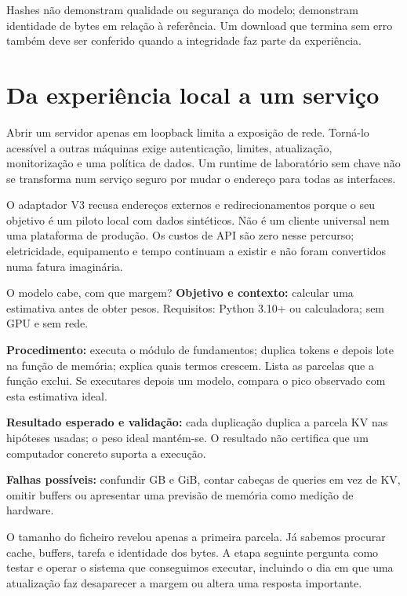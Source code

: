 Hashes não demonstram qualidade ou segurança do modelo; demonstram identidade de bytes em relação à referência. Um download que termina sem erro também deve ser conferido quando a integridade faz parte da experiência.

\section{Da experiência local a um serviço}
Abrir um servidor apenas em loopback limita a exposição de rede. Torná-lo acessível a outras máquinas exige autenticação, limites, atualização, monitorização e uma política de dados. Um runtime de laboratório sem chave não se transforma num serviço seguro por mudar o endereço para todas as interfaces.

O adaptador V3 recusa endereços externos e redirecionamentos porque o seu objetivo é um piloto local com dados sintéticos. Não é um cliente universal nem uma plataforma de produção. Os custos de API são zero nesse percurso; eletricidade, equipamento e tempo continuam a existir e não foram convertidos numa fatura imaginária.

\begin{promptlabbox}{O modelo cabe, com que margem?}
\textbf{Objetivo e contexto:} calcular uma estimativa antes de obter pesos. Requisitos: Python 3.10+ ou calculadora; sem GPU e sem rede.

\textbf{Procedimento:} executa o módulo de fundamentos; duplica tokens e depois lote na função de memória; explica quais termos crescem. Lista as parcelas que a função exclui. Se executares depois um modelo, compara o pico observado com esta estimativa ideal.

\textbf{Resultado esperado e validação:} cada duplicação duplica a parcela KV nas hipóteses usadas; o peso ideal mantém-se. O resultado não certifica que um computador concreto suporta a execução.

\textbf{Falhas possíveis:} confundir GB e GiB, contar cabeças de queries em vez de KV, omitir buffers ou apresentar uma previsão de memória como medição de hardware.
\end{promptlabbox}

O tamanho do ficheiro revelou apenas a primeira parcela. Já sabemos procurar cache, buffers, tarefa e identidade dos bytes. A etapa seguinte pergunta como testar e operar o sistema que conseguimos executar, incluindo o dia em que uma atualização faz desaparecer a margem ou altera uma resposta importante.
